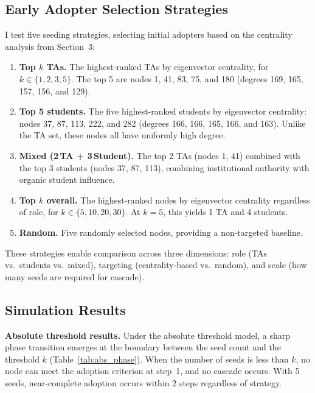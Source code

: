 \documentclass[12pt]{article}
\begin{document}
\subsection{Early Adopter Selection Strategies}

I test five seeding strategies, selecting initial adopters based on the centrality analysis from Section~3:

\begin{enumerate}
    \item \textbf{Top $k$ TAs.} The highest-ranked TAs by eigenvector centrality, for $k \in \{1, 2, 3, 5\}$. The top 5 are nodes 1, 41, 83, 75, and 180 (degrees 169, 165, 157, 156, and 129).

    \item \textbf{Top 5 students.} The five highest-ranked students by eigenvector centrality: nodes 37, 87, 113, 222, and 282 (degrees 166, 166, 165, 166, and 163). Unlike the TA set, these nodes all have uniformly high degree.

    \item \textbf{Mixed (2\,TA + 3\,Student).} The top 2 TAs (nodes 1, 41) combined with the top 3 students (nodes 37, 87, 113), combining institutional authority with organic student influence.

    \item \textbf{Top $k$ overall.} The highest-ranked nodes by eigenvector centrality regardless of role, for $k \in \{5, 10, 20, 30\}$. At $k = 5$, this yields 1 TA and 4 students.

    \item \textbf{Random.} Five randomly selected nodes, providing a non-targeted baseline.
\end{enumerate}

These strategies enable comparison across three dimensions: role (TAs vs.\ students vs.\ mixed), targeting (centrality-based vs.\ random), and scale (how many seeds are required for cascade).

\subsection{Simulation Results}
\label{sec:sim_results}

\textbf{Absolute threshold results.}
Under the absolute threshold model, a sharp phase transition emerges at the boundary between the seed count and the threshold $k$ (Table~\ref{tab:abs_phase}). When the number of seeds is less than $k$, no node can meet the adoption criterion at step~1, and no cascade occurs. With 5 seeds, near-complete adoption occurs within 2 steps regardless of strategy.
\end{document}
